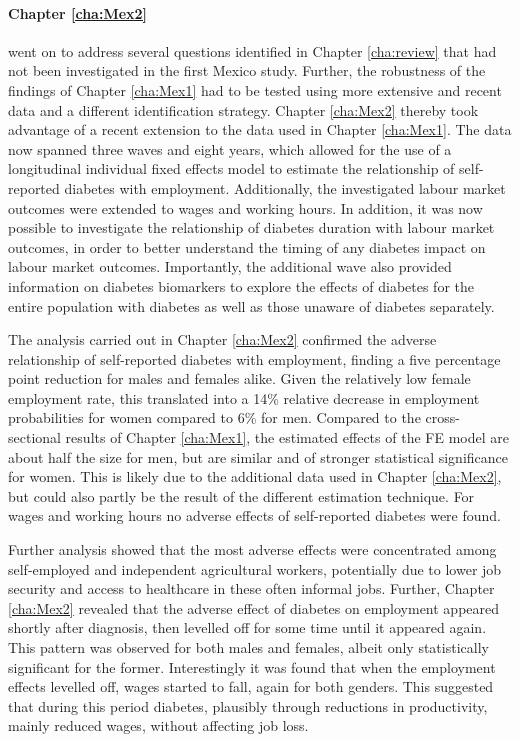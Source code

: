 \paragraph{Chapter \ref{cha:Mex2}}  went on to address several questions identified in Chapter \ref{cha:review} that had not been investigated in the first Mexico study. Further, the robustness of the findings of Chapter \ref{cha:Mex1} had to be tested using more extensive and recent data and a different identification strategy. Chapter \ref{cha:Mex2} thereby took advantage of a recent extension to the data used in Chapter \ref{cha:Mex1}. The data now spanned three waves and eight years, which allowed for the use of a longitudinal individual fixed effects model to estimate the relationship of self-reported diabetes with employment. Additionally, the investigated labour market outcomes were extended to wages and working hours. In addition, it was now possible to investigate the relationship of diabetes duration with labour market outcomes, in order to better understand the timing of any diabetes impact on labour market outcomes. Importantly, the additional wave also provided information on diabetes biomarkers to explore the effects of diabetes for the entire population with diabetes as well as those unaware of diabetes separately.

The analysis carried out in Chapter \ref{cha:Mex2} confirmed the adverse relationship of self-reported diabetes with employment, finding a five percentage point reduction for males and females alike. Given the relatively low female employment rate, this translated into a 14\% relative decrease in employment probabilities for women compared to 6\% for men. Compared to the cross-sectional results of Chapter \ref{cha:Mex1}, the estimated effects of the \ac{FE} model are about half the size for men, but are similar and of stronger statistical significance for women. This is likely due to the additional data used in Chapter \ref{cha:Mex2}, but could also partly be the result of the different estimation technique. For wages and working hours no adverse effects of self-reported diabetes were found.

Further analysis showed that the most adverse effects were concentrated among self-employed and independent agricultural workers, potentially due to lower job security and access to healthcare in these often informal jobs. Further, Chapter \ref{cha:Mex2} revealed that the adverse effect of diabetes on employment appeared shortly after diagnosis, then levelled off for some time until it appeared again. This pattern was observed for both males and females, albeit only statistically significant for the former. Interestingly it was found that when the employment effects levelled off, wages started to fall, again for both genders. This suggested that during this period diabetes, plausibly through reductions in productivity, mainly reduced wages, without affecting job loss.


